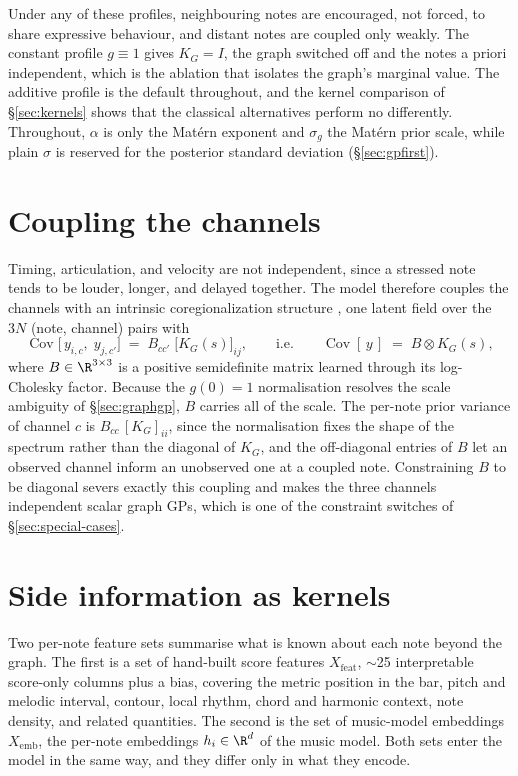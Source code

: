 Under any of these profiles, neighbouring notes are encouraged, not forced,
to share expressive behaviour, and distant notes are coupled only weakly.
The constant profile $g \equiv 1$ gives $K_G = I$, the graph switched off
and the notes a priori independent, which is the ablation that isolates the
graph's marginal value. The additive profile is the default throughout, and
the kernel comparison of \S\ref{sec:kernels} shows that the classical
alternatives perform no differently. Throughout, $\alpha$ is only the
Mat\'ern exponent and $\sigma_g$ the Mat\'ern prior scale, while plain
$\sigma$ is reserved for the posterior standard deviation
(\S\ref{sec:gpfirst}).

\section{Coupling the channels}\label{sec:coreg}
Timing, articulation, and velocity are not independent, since a stressed
note tends to be louder, longer, and delayed together. The model therefore
couples the channels with an intrinsic coregionalization structure
\cite{bonilla2008}, one latent field over the $3N$ (note, channel) pairs with
\begin{equation}
  \operatorname{Cov}\bigl[\, y_{i,c},\; y_{j,c'} \bigr]
  \;=\; B_{cc'}\; \bigl[K_G(s)\bigr]_{ij},
  \qquad \text{i.e.} \qquad
  \operatorname{Cov}[\, y \,] \;=\; B \otimes K_G(s),
  \label{eq:icm}
\end{equation}
where $B \in \R^{3 \times 3}$ is a positive semidefinite matrix learned
through its log-Cholesky factor. Because the $g(0) = 1$ normalisation
resolves the scale ambiguity of \S\ref{sec:graphgp}, $B$ carries all of the
scale. The per-note prior variance of channel $c$ is $B_{cc}\,[K_G]_{ii}$,
since the normalisation fixes the shape of the spectrum rather than the
diagonal of $K_G$, and the off-diagonal entries of $B$ let an observed
channel inform an unobserved one at a coupled note. Constraining $B$ to be
diagonal severs exactly this coupling and makes the three channels
independent scalar graph GPs, which is one of the constraint switches of
\S\ref{sec:special-cases}.

\section{Side information as kernels}\label{sec:features}
Two per-note feature sets summarise what is known about each note beyond the
graph. The first is a set of hand-built score features $X_{\mathrm{feat}}$,
$\sim$25 interpretable score-only columns plus a bias, covering the metric
position in the bar, pitch and melodic interval, contour, local rhythm,
chord and harmonic context, note density, and related quantities. The second
is the set of music-model embeddings $X_{\mathrm{emb}}$, the per-note
embeddings $h_i \in \R^{d}$ of the music model. Both sets enter the model in
the same way, and they differ only in what they encode.

